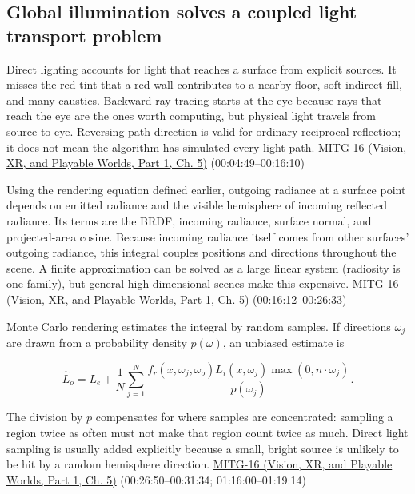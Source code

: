 \subsection{Global illumination solves a coupled light transport problem}\label{03-visual-computing-i-ch011-global-illumination-solves-a-coupled-light-transport-problem}

\hypertarget{03-visual-computing-i-ch011-global-illumination-solves-a-coupled-light-transport-problem}{}

Direct lighting accounts for light that reaches a surface from explicit sources. It misses the red tint that a red wall contributes to a nearby floor, soft indirect fill, and many caustics. Backward ray tracing starts at the eye because rays that reach the eye are the ones worth computing, but physical light travels from source to eye. Reversing path direction is valid for ordinary reciprocal reflection; it does not mean the algorithm has simulated every light path. \href{../07-Vision-XR-and-Playable-Worlds-P01/main.pdf\#04-visual-computing-ii-ch036-mitg-16---global-illumination}{MITG-16 (Vision, XR, and Playable Worlds, Part 1, Ch. 5)} (00:04:49--00:16:10)

Using the rendering equation defined earlier, outgoing radiance at a surface point depends on emitted radiance and the visible hemisphere of incoming reflected radiance. Its terms are the BRDF, incoming radiance, surface normal, and projected-area cosine. Because incoming radiance itself comes from other surfaces' outgoing radiance, this integral couples positions and directions throughout the scene. A finite approximation can be solved as a large linear system (radiosity is one family), but general high-dimensional scenes make this expensive. \href{../07-Vision-XR-and-Playable-Worlds-P01/main.pdf\#04-visual-computing-ii-ch036-mitg-16---global-illumination}{MITG-16 (Vision, XR, and Playable Worlds, Part 1, Ch. 5)} (00:16:12--00:26:33)

Monte Carlo rendering estimates the integral by random samples. If directions \(\omega_j\) are drawn from a probability density \(p(\omega)\), an unbiased estimate is

\[
\widehat L_o=L_e+\frac1N\sum_{j=1}^{N}\frac{f_r(x,\omega_j,\omega_o)L_i(x,\omega_j)\max(0,n\cdot\omega_j)}{p(\omega_j)}.
\]

The division by \(p\) compensates for where samples are concentrated: sampling a region twice as often must not make that region count twice as much. Direct light sampling is usually added explicitly because a small, bright source is unlikely to be hit by a random hemisphere direction. \href{../07-Vision-XR-and-Playable-Worlds-P01/main.pdf\#04-visual-computing-ii-ch036-mitg-16---global-illumination}{MITG-16 (Vision, XR, and Playable Worlds, Part 1, Ch. 5)} (00:26:50--00:31:34; 01:16:00--01:19:14)

